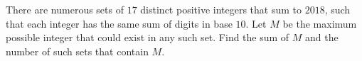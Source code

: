 There are numerous sets of $17$ distinct positive integers that sum to $2018$,  such that each integer has the same sum of digits in base $10$. Let $M$ be the maximum possible integer that could exist in any such set. Find the sum of $M$ and the number of such sets that contain $M$.
